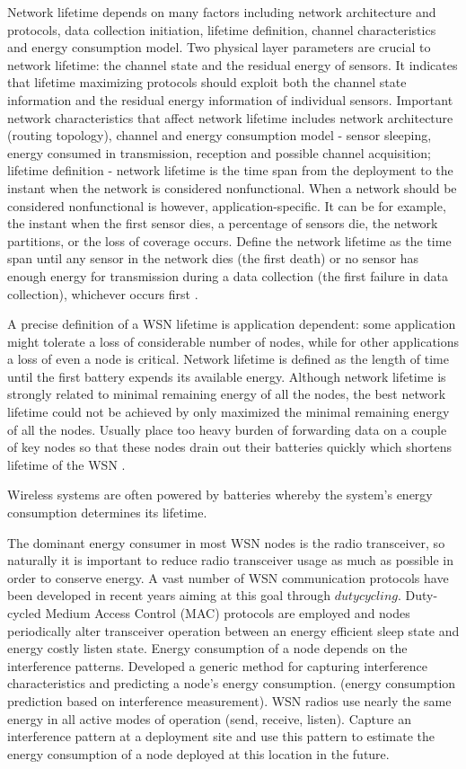 Network lifetime depends on many factors including network architecture and protocols, data collection initiation, lifetime definition, channel characteristics and energy consumption model. Two physical layer parameters are crucial to network lifetime: the channel state and the residual energy of sensors. It indicates that lifetime maximizing protocols should exploit both the channel state information and the residual energy information of individual sensors. Important network characteristics that affect network lifetime includes network architecture (routing topology), channel and energy consumption model - sensor sleeping, energy consumed in transmission, reception and possible channel acquisition; lifetime definition - network lifetime is the time span from the deployment to the instant when the network is considered nonfunctional. When a network should be considered nonfunctional is however, application-specific. It can be for example, the instant when the first sensor dies, a percentage of sensors die, the network partitions, or the loss of coverage occurs. Define the network lifetime as the time span until any sensor in the network dies (the first death) or no sensor has enough energy for transmission during a data collection (the first failure in data collection), whichever occurs first \cite{maxmin}.

A precise definition of a WSN lifetime is application dependent: some application might tolerate a loss of considerable number of nodes, while for other applications a loss of even a node is critical. Network lifetime is defined as the length of time until the first battery expends its available energy. Although network lifetime is strongly related to minimal remaining energy of all the nodes, the best network lifetime could not be achieved by only maximized the minimal remaining energy of all the nodes. Usually place too heavy burden of forwarding data on a couple of key nodes so that these nodes drain out their batteries quickly which shortens lifetime of the WSN \cite{erapl}.

Wireless systems are often powered by batteries whereby the system's energy consumption determines its lifetime.

The dominant energy consumer in most WSN nodes is the radio transceiver, so naturally it is important to reduce radio transceiver usage as much as possible in order to conserve energy. A vast number of WSN communication protocols have been developed in recent years aiming at this goal through $duty cycling$. Duty-cycled Medium Access Control (MAC) protocols are employed and nodes periodically alter transceiver operation between an energy efficient sleep state and energy costly listen state. Energy consumption of a node depends on the interference patterns. Developed a generic method for capturing interference characteristics and predicting a node's energy consumption. (energy consumption prediction based on interference measurement). WSN radios use nearly the same energy in all active modes of operation (send, receive, listen). Capture an interference pattern at a deployment site and use this pattern to estimate the energy consumption of a node deployed at this location in the future. \cite{alexlifetime}

